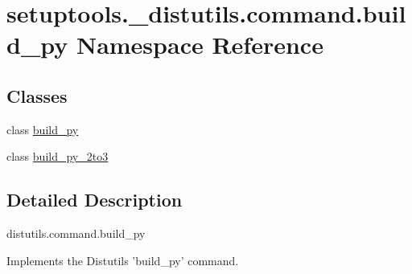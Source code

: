 \hypertarget{namespacesetuptools_1_1__distutils_1_1command_1_1build__py}{}\section{setuptools.\+\_\+distutils.\+command.\+build\+\_\+py Namespace Reference}
\label{namespacesetuptools_1_1__distutils_1_1command_1_1build__py}
\subsection*{Classes}
\begin{DoxyCompactItemize}
\item 
class \hyperlink{classsetuptools_1_1__distutils_1_1command_1_1build__py_1_1build__py}{build\+\_\+py}
\item 
class \hyperlink{classsetuptools_1_1__distutils_1_1command_1_1build__py_1_1build__py__2to3}{build\+\_\+py\+\_\+2to3}
\end{DoxyCompactItemize}


\subsection{Detailed Description}
\begin{DoxyVerb}distutils.command.build_py

Implements the Distutils 'build_py' command.\end{DoxyVerb}
 